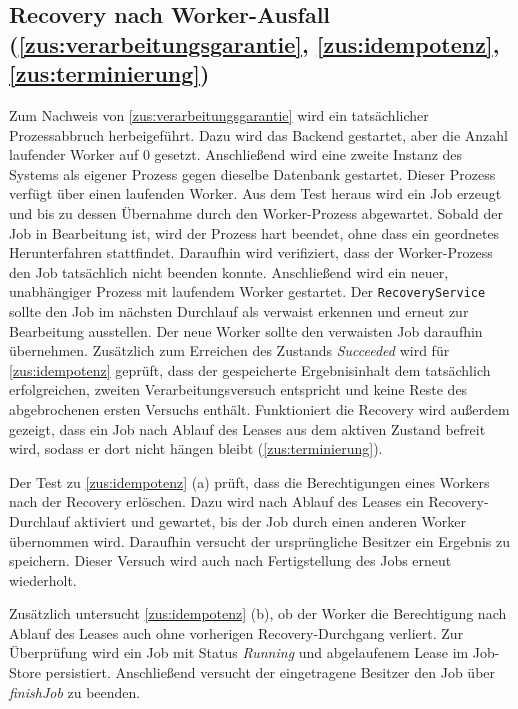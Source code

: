 \subsection{Recovery nach Worker-Ausfall (\ref{zus:verarbeitungsgarantie}, \ref{zus:idempotenz}, \ref{zus:terminierung})}
\label{subsec:recovery_fehlersimulation}
Zum Nachweis von \ref{zus:verarbeitungsgarantie} wird ein tatsächlicher Prozessabbruch herbeigeführt.
Dazu wird das Backend gestartet, aber die Anzahl laufender Worker auf 0 gesetzt.
Anschließend wird eine zweite Instanz des Systems als eigener Prozess gegen dieselbe Datenbank gestartet.
Dieser Prozess verfügt über einen laufenden Worker.
Aus dem Test heraus wird ein Job erzeugt und bis zu dessen Übernahme durch den Worker-Prozess abgewartet.
Sobald der Job in Bearbeitung ist, wird der Prozess hart beendet, ohne dass ein geordnetes Herunterfahren stattfindet.
Daraufhin wird verifiziert, dass der Worker-Prozess den Job tatsächlich nicht beenden konnte.
Anschließend wird ein neuer, unabhängiger Prozess mit laufendem Worker gestartet.
Der \texttt{RecoveryService} sollte den Job im nächsten Durchlauf als verwaist erkennen und erneut zur Bearbeitung ausstellen.
Der neue Worker sollte den verwaisten Job daraufhin übernehmen.
Zusätzlich zum Erreichen des Zustands \textit{Succeeded} wird für \ref{zus:idempotenz} geprüft, dass der gespeicherte Ergebnisinhalt dem
tatsächlich erfolgreichen, zweiten Verarbeitungsversuch entspricht und keine Reste des abgebrochenen ersten Versuchs enthält.
Funktioniert die Recovery wird außerdem gezeigt, dass ein Job nach Ablauf des Leases aus dem aktiven Zustand befreit wird,
sodass er dort nicht hängen bleibt (\ref{zus:terminierung}).

Der Test zu \ref{zus:idempotenz} (a) prüft, dass die Berechtigungen eines Workers nach der Recovery erlöschen.
Dazu wird nach Ablauf des Leases ein Recovery-Durchlauf aktiviert und gewartet, bis der Job durch einen anderen Worker
übernommen wird.
Daraufhin versucht der ursprüngliche Besitzer ein Ergebnis zu speichern.
Dieser Versuch wird auch nach Fertigstellung des Jobs erneut wiederholt.

Zusätzlich untersucht \ref{zus:idempotenz} (b), ob der Worker die Berechtigung nach Ablauf des Leases auch ohne vorherigen Recovery-Durchgang
verliert.
Zur Überprüfung wird ein Job mit Status \textit{Running} und abgelaufenem Lease im Job-Store persistiert.
Anschließend versucht der eingetragene Besitzer den Job über \textit{finishJob} zu beenden.

